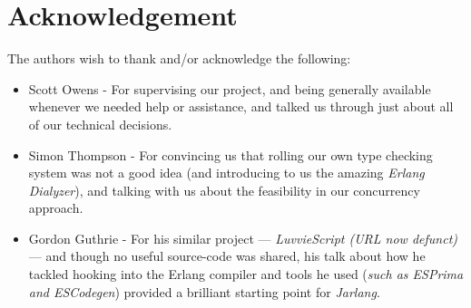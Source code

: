 \documentclass[twoside,12pt,titlepage,a4paper]{article}
\newcommand\blankpage{%
    \null
    \thispagestyle{empty}%
    \addtocounter{page}{-1}%
    \newpage}
\begin{document}
\section{Acknowledgement}
The authors wish to thank and/or acknowledge the following:
\begin{itemize}
	\item Scott Owens - For supervising our project, and being generally available whenever we needed help or assistance, and talked us through just about all of our technical decisions.
	\item Simon Thompson - For convincing us that rolling our own type checking system was not a good idea (and introducing to us the amazing \textit{Erlang Dialyzer}), and talking with us about the feasibility in our concurrency approach.
	\item Gordon Guthrie - For his similar project --- \textit{LuvvieScript (URL now defunct)} --- and though no useful source-code was shared, his talk about how he tackled hooking into the Erlang compiler and tools he used (\textit{such as ESPrima and ESCodegen}) provided a brilliant starting point for \textit{Jarlang}.
\end{itemize}



%


\blankpage

\appendix
\end{document}
